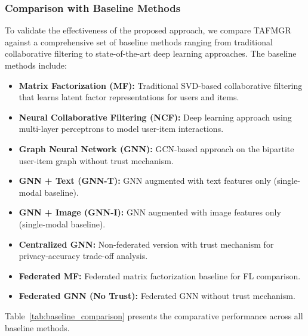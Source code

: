 \subsubsection{Comparison with Baseline Methods}

To validate the effectiveness of the proposed approach, we compare TAFMGR against a comprehensive set of baseline methods ranging from traditional collaborative filtering to state-of-the-art deep learning approaches. The baseline methods include:

\begin{itemize}
    \item \textbf{Matrix Factorization (MF):} Traditional SVD-based collaborative filtering that learns latent factor representations for users and items.
    \item \textbf{Neural Collaborative Filtering (NCF):} Deep learning approach using multi-layer perceptrons to model user-item interactions.
    \item \textbf{Graph Neural Network (GNN):} GCN-based approach on the bipartite user-item graph without trust mechanism.
    \item \textbf{GNN + Text (GNN-T):} GNN augmented with text features only (single-modal baseline).
    \item \textbf{GNN + Image (GNN-I):} GNN augmented with image features only (single-modal baseline).
    \item \textbf{Centralized GNN:} Non-federated version with trust mechanism for privacy-accuracy trade-off analysis.
    \item \textbf{Federated MF:} Federated matrix factorization baseline for FL comparison.
    \item \textbf{Federated GNN (No Trust):} Federated GNN without trust mechanism.
\end{itemize}

Table~\ref{tab:baseline_comparison} presents the comparative performance across all baseline methods.

